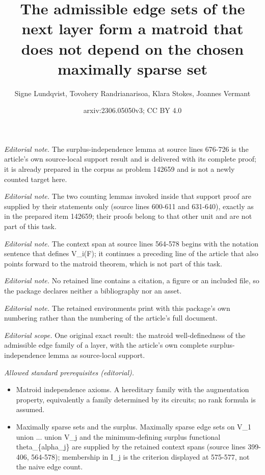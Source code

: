 \documentclass[10pt,a4paper]{article}
\title{The admissible edge sets of the next layer form a matroid that does not depend on the chosen maximally sparse set}
\author{Signe Lundqvist, Tovohery Randrianarisoa, Klara Stokes, Joannes Vermant}
\date{arxiv:2306.05050v3; CC BY 4.0}
\begin{document}
\maketitle
\noindent\textit{Editorial note.} The surplus-independence lemma at source lines 676-726 is the article's own source-local support result and is delivered with its complete proof; it is already prepared in the corpus as problem 142659 and is not a newly counted target here.\par\medskip
\noindent\textit{Editorial note.} The two counting lemmas invoked inside that support proof are supplied by their statements only (source lines 600-611 and 631-640), exactly as in the prepared item 142659; their proofs belong to that other unit and are not part of this task.\par\medskip
\noindent\textit{Editorial note.} The context span at source lines 564-578 begins with the notation sentence that defines V\_i(F); it continues a preceding line of the article that also points forward to the matroid theorem, which is not part of this task.\par\medskip
\noindent\textit{Editorial note.} No retained line contains a citation, a figure or an included file, so the package declares neither a bibliography nor an asset.\par\medskip
\noindent\textit{Editorial note.} The retained environments print with this package's own numbering rather than the numbering of the article's full document.\par\medskip
\noindent\textit{Editorial scope.} One original exact result: the matroid well-definedness of the admissible edge family of a layer, with the article's own complete surplus-independence lemma as source-local support.\par\medskip
\noindent\textit{Allowed standard prerequisites (editorial).}\begin{itemize}
\item Matroid independence axioms. A hereditary family with the augmentation property, equivalently a family determined by its circuits; no rank formula is assumed.
\item Maximally sparse sets and the surplus. Maximally sparse edge sets on V\_1 union ... union V\_j and the minimum-defining surplus functional theta\_\{alpha\_j\} are supplied by the retained context spans (source lines 399-406, 564-578); membership in I\_j is the criterion displayed at 575-577, not the naive edge count.
\end{itemize}\medskip
\end{document}

